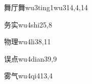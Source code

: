 \begin{verbete}{舞厅舞}{wu3ting1wu3}{14,4,14}
\end{verbete}

\begin{verbete}{务实}{wu4shi2}{5,8}
\end{verbete}

\begin{verbete}{物理}{wu4li3}{8,11}
\end{verbete}

\begin{verbete}{误点}{wu4dian3}{9,9}
\end{verbete}

\begin{verbete}{雾气}{wu4qi4}{13,4}
\end{verbete}

